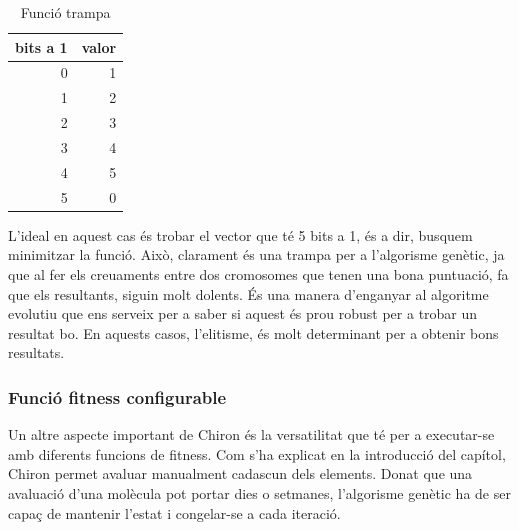 
\begin{table}
\centering
\caption{Funció trampa}
\label{table:ftrampa}
\begin{tabular}{|r|r|}
\hline
\multicolumn{1}{|c|}{\textbf{bits a 1 }} & \multicolumn{1}{c|}{\textbf{ valor}} \\
\hline
\hline
0 & 1 \\
1 & 2 \\
2 & 3 \\
3 & 4 \\
4 & 5 \\
5 & 0 \\
\hline
\end{tabular}
\end{table}


L'ideal en aquest cas és trobar el vector que té 5 bits a 1, és a dir, busquem
minimitzar la funció.  Això, clarament és una trampa per a l'algorisme genètic,
ja que al fer els creuaments entre dos cromosomes que tenen una bona puntuació,
fa que els resultants, siguin molt dolents. És una manera d'enganyar al
algoritme evolutiu que ens serveix per a saber si aquest és prou robust per a
trobar un resultat bo.  En aquests casos, l'elitisme, és molt determinant per a
obtenir bons resultats.

\subsubsection{Funció fitness configurable} %
\label{ssub:Funcio fitness configurable}

Un altre aspecte important de Chiron és la versatilitat que té per a executar-se
amb diferents funcions de fitness.  Com s'ha explicat en la introducció del
capítol, Chiron permet avaluar manualment cadascun dels elements.  Donat que una
avaluació d'una molècula pot portar dies o setmanes, l'algorisme genètic ha de ser
capaç de mantenir l'estat i congelar-se a cada iteració.

